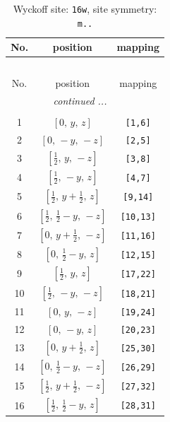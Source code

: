 \documentclass[fleqn,8pt]{jsarticle}
\begin{document}
\renewcommand{\arraystretch}{1.2}
\begin{longtable}{ccc}
\caption{Wyckoff site: {\tt 16w}, site symmetry: {\tt m..}}
 \\
 \hline \hline
No. & position & mapping \\ \hline \endfirsthead

\multicolumn{2}{l}{\tablename\ \thetable{}} \\
 \hline \hline
No. & position & mapping \\ \hline \endhead

 \hline \hline
\multicolumn{2}{r}{\footnotesize\it continued ...} \\ \endfoot

 \hline \hline
\multicolumn{2}{r}{} \\ \endlastfoot

1 & $\left[ 0,\, y,\, z \right]$ & {\tt [1,6]} \\ \hline
2 & $\left[ 0,\, - y,\, - z \right]$ & {\tt [2,5]} \\ \hline
3 & $\left[ \frac{1}{2},\, y,\, - z \right]$ & {\tt [3,8]} \\ \hline
4 & $\left[ \frac{1}{2},\, - y,\, z \right]$ & {\tt [4,7]} \\ \hline
5 & $\left[ \frac{1}{2},\, y + \frac{1}{2},\, z \right]$ & {\tt [9,14]} \\ \hline
6 & $\left[ \frac{1}{2},\, \frac{1}{2} - y,\, - z \right]$ & {\tt [10,13]} \\ \hline
7 & $\left[ 0,\, y + \frac{1}{2},\, - z \right]$ & {\tt [11,16]} \\ \hline
8 & $\left[ 0,\, \frac{1}{2} - y,\, z \right]$ & {\tt [12,15]} \\ \hline
9 & $\left[ \frac{1}{2},\, y,\, z \right]$ & {\tt [17,22]} \\ \hline
10 & $\left[ \frac{1}{2},\, - y,\, - z \right]$ & {\tt [18,21]} \\ \hline
11 & $\left[ 0,\, y,\, - z \right]$ & {\tt [19,24]} \\ \hline
12 & $\left[ 0,\, - y,\, z \right]$ & {\tt [20,23]} \\ \hline
13 & $\left[ 0,\, y + \frac{1}{2},\, z \right]$ & {\tt [25,30]} \\ \hline
14 & $\left[ 0,\, \frac{1}{2} - y,\, - z \right]$ & {\tt [26,29]} \\ \hline
15 & $\left[ \frac{1}{2},\, y + \frac{1}{2},\, - z \right]$ & {\tt [27,32]} \\ \hline
16 & $\left[ \frac{1}{2},\, \frac{1}{2} - y,\, z \right]$ & {\tt [28,31]} \\
\end{longtable}
\end{document}
